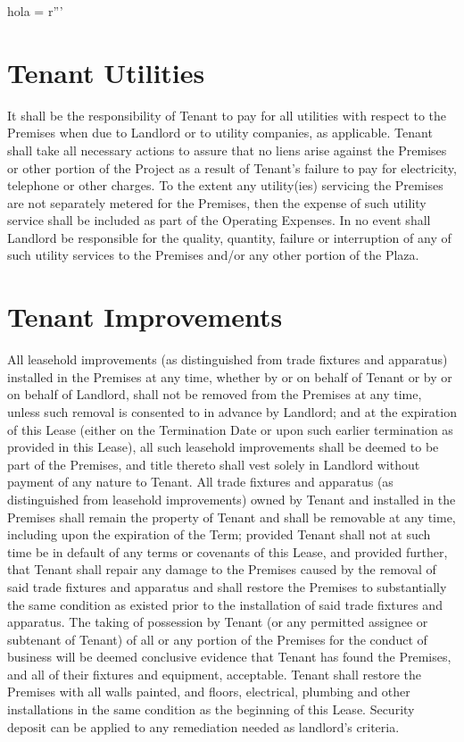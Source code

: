 hola = r'''\documentclass{article}
\begin{document}
\section{Tenant Utilities}
    It shall be the responsibility of Tenant to pay for all utilities with respect to the Premises when due to Landlord or to utility companies, as applicable. Tenant shall take all necessary actions to assure that no liens arise against the Premises or other portion of the Project as a result of Tenant's failure to pay for electricity, telephone or other charges. To the extent any utility(ies) servicing the Premises are not separately metered for the Premises, then the expense of such utility service shall be included as part of the Operating Expenses. In no event shall Landlord be responsible for the quality, quantity, failure or interruption of any of such utility services to the Premises and/or any other portion of the Plaza.
\section{Tenant Improvements}
    All leasehold improvements (as distinguished from trade fixtures and apparatus) installed in the Premises at any time, whether by or on behalf of Tenant or by or on behalf of Landlord, shall not be removed from the Premises at any time, unless such removal is consented to in advance by Landlord; and at the expiration of this Lease (either on the Termination Date or upon such earlier termination as provided in this Lease), all such leasehold improvements shall be deemed to be part of the Premises, and title thereto shall vest solely in Landlord without payment of any nature to Tenant. All trade fixtures and apparatus (as distinguished from leasehold improvements) owned by Tenant and installed in the Premises shall remain the property of Tenant and shall be removable at any time, including upon the expiration of the Term; provided Tenant shall not at such time be in default of any terms or covenants of this Lease, and provided further, that Tenant shall repair any damage to the Premises caused by the removal of said trade fixtures and apparatus and shall restore the Premises to substantially the same condition as existed prior to the installation of said trade fixtures and apparatus. The taking of possession by Tenant (or any permitted assignee or subtenant of Tenant) of all or any portion of the Premises for the conduct of business will be deemed conclusive evidence that Tenant has found the Premises, and all of their fixtures and equipment, acceptable.  Tenant shall restore the Premises with all walls painted, and floors, electrical, plumbing and other installations in the same condition as the beginning of this Lease.  Security deposit can be applied to any remediation needed as landlord’s criteria.
\end{document}
